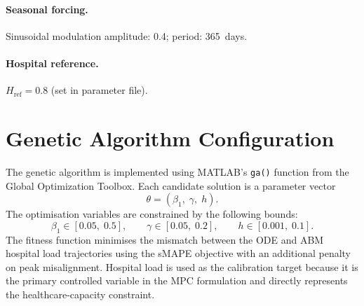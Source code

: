\paragraph{Seasonal forcing.}
Sinusoidal modulation amplitude: 0.4; period: 365~days.

\paragraph{Hospital reference.}
$H_{\mathrm{ref}} = 0.8$ (set in parameter file).

\section{Genetic Algorithm Configuration}
\label{apx:ga_config}

The genetic algorithm is implemented using MATLAB's \texttt{ga()} function from the Global Optimization Toolbox.
Each candidate solution is a parameter vector
\[
  \theta = (\beta_1,\; \gamma,\; h).
\]
The optimisation variables are constrained by the following bounds:
\[
  \beta_1 \in [0.05,\; 0.5], \qquad
  \gamma \in [0.05,\; 0.2], \qquad
  h \in [0.001,\; 0.1].
\]
The fitness function minimises the mismatch between the ODE and ABM hospital load trajectories using the sMAPE objective with an additional penalty on peak misalignment.
Hospital load is used as the calibration target because it is the primary controlled variable in the MPC formulation and directly represents the healthcare-capacity constraint.
